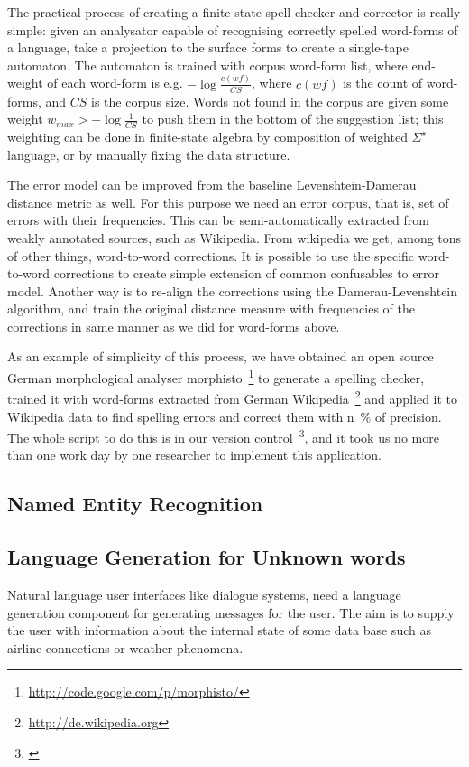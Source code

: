 \documentclass{llncs}
\begin{document}
The practical process of creating a finite-state spell-checker and corrector
is really simple: given an analysator capable of recognising correctly spelled
word-forms of a language, take a projection to the surface forms to create a
single-tape automaton. The automaton is trained with corpus word-form list, 
where end-weight of each word-form is e.g. $-\log\frac{c(wf)}{CS}$, where 
$c(wf)$ is the count of word-forms, and $CS$ is the corpus size. Words not
found in the corpus are given some weight $w_{max} > -\log\frac{1}{CS}$ to
push them in the bottom of the suggestion list; this weighting can be done
in finite-state algebra by composition of weighted $\Sigma^{\star}$ language,
or by manually fixing the data structure.

The error model can be improved from the baseline Levenshtein-Damerau distance
metric as well. For this purpose we need an error corpus, that is, set of
errors with their frequencies. This can be semi-automatically extracted from
weakly annotated sources, such as Wikipedia. From wikipedia we get, among tons
of other things, word-to-word corrections. It is possible to use the specific
word-to-word corrections to create simple extension of common confusables to
error model. Another way is to re-align the corrections using the
Damerau-Levenshtein algorithm, and train the original distance measure with
frequencies of the corrections in same manner as we did for word-forms above.

As an example of simplicity of this process, we have obtained an open source
German morphological analyser
morphisto~\footnote{\url{http://code.google.com/p/morphisto/}} to generate a
spelling checker, trained it with word-forms extracted from German
Wikipedia~\footnote{\url{http://de.wikipedia.org}} and applied it to Wikipedia
data to find spelling errors and correct them with n~\% of precision. The whole
script to do this is in our version control~\footnote{\url{}}, and it took us
no more than one work day by one researcher to implement this application.

\subsection{Named Entity Recognition}

\subsection{Language Generation for Unknown words}
\label{sec:morph-generation}
Natural language user interfaces like dialogue systems, need a
language generation component for generating messages for the
user. The aim is to supply the user with information about the
internal state of some data base such as airline connections or
weather phenomena.
\end{document}
